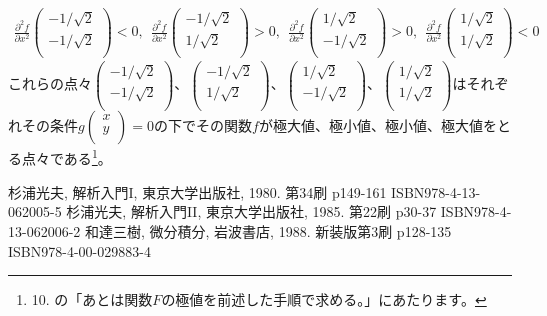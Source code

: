\documentclass[dvipdfmx]{jsarticle}
\begin{document}
\begin{align*}
\frac{\partial^{2}f}{\partial x^{2}}\begin{pmatrix}
 - {1}/{\sqrt{2}} \\
 - {1}/{\sqrt{2}} \\
\end{pmatrix} < 0,\ \ \frac{\partial^{2}f}{\partial x^{2}}\begin{pmatrix}
 - {1}/{\sqrt{2}} \\
{1}/{\sqrt{2}} \\
\end{pmatrix} > 0,\ \ \frac{\partial^{2}f}{\partial x^{2}}\begin{pmatrix}
{1}/{\sqrt{2}} \\
 - {1}/{\sqrt{2}} \\
\end{pmatrix} > 0,\ \ \frac{\partial^{2}f}{\partial x^{2}}\begin{pmatrix}
{1}/{\sqrt{2}} \\
{1}/{\sqrt{2}} \\
\end{pmatrix} < 0
\end{align*}
これらの点々$\begin{pmatrix}
 - {1}/{\sqrt{2}} \\
 - {1}/{\sqrt{2}} \\
\end{pmatrix}$、$\begin{pmatrix}
 - {1}/{\sqrt{2}} \\
{1}/{\sqrt{2}} \\
\end{pmatrix}$、$\begin{pmatrix}
{1}/{\sqrt{2}} \\
 - {1}/{\sqrt{2}} \\
\end{pmatrix}$、$\begin{pmatrix}
{1}/{\sqrt{2}} \\
{1}/{\sqrt{2}} \\
\end{pmatrix}$はそれぞれその条件$g\begin{pmatrix}
x \\
y \\
\end{pmatrix} = 0$の下でその関数$f$が極大値、極小値、極小値、極大値をとる点々である\footnote{10. の「あとは関数$F$の極値を前述した手順で求める。」にあたります。}。
\begin{thebibliography}{50}
  杉浦光夫, 解析入門I, 東京大学出版社, 1980. 第34刷 p149-161 ISBN978-4-13-062005-5
  杉浦光夫, 解析入門II, 東京大学出版社, 1985. 第22刷 p30-37 ISBN978-4-13-062006-2
  和達三樹, 微分積分, 岩波書店, 1988. 新装版第3刷 p128-135 ISBN978-4-00-029883-4
\end{thebibliography}
\end{document}
